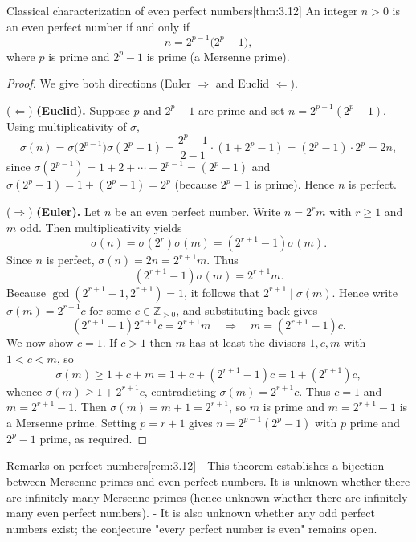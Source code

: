 \documentclass[10pt]{article}
\theoremstyle{definition}
\theoremstyle{plain}
\numberwithin{equation}{section}
\begin{document}
\begin{define}{Classical characterization of even perfect numbers}[thm:3.12]
An integer $n>0$ is an even perfect number if and only if
\[
n=2^{p-1}\big(2^p-1\big),
\]
where $p$ is prime and $2^p-1$ is prime (a Mersenne prime).
\end{define}

\begin{proof}
We give both directions (Euler $\Rightarrow$ and Euclid $\Leftarrow$).

\medskip\noindent
($\Leftarrow$) \textbf{(Euclid).} Suppose $p$ and $2^p-1$ are prime and set $n=2^{p-1}(2^p-1)$. Using multiplicativity of $\sigma$,
\[
\sigma(n)=\sigma\big(2^{p-1}\big)\sigma(2^p-1)
=\frac{2^p-1}{2-1}\cdot (1+2^p-1)
=(2^p-1)\cdot 2^p = 2n,
\]
since $\sigma(2^{p-1})=1+2+\cdots+2^{p-1}=(2^p-1)$ and $\sigma(2^p-1)=1+(2^p-1)=2^p$ (because $2^p-1$ is prime). Hence $n$ is perfect.

\medskip\noindent
($\Rightarrow$) \textbf{(Euler).} Let $n$ be an even perfect number. Write $n=2^r m$ with $r\ge1$ and $m$ odd. Then multiplicativity yields
\[
\sigma(n)=\sigma(2^r)\sigma(m)=(2^{r+1}-1)\sigma(m).
\]
Since $n$ is perfect, $\sigma(n)=2n=2^{r+1}m$. Thus
\[
(2^{r+1}-1)\sigma(m)=2^{r+1}m.
\]
Because $\gcd(2^{r+1}-1,2^{r+1})=1$, it follows that $2^{r+1}\mid \sigma(m)$. Hence write $\sigma(m)=2^{r+1}c$ for some $c\in\mathbb{Z}_{>0}$, and substituting back gives
\[
(2^{r+1}-1)2^{r+1}c=2^{r+1}m \quad\Longrightarrow\quad m=(2^{r+1}-1)c.
\]
We now show $c=1$. If $c>1$ then $m$ has at least the divisors $1,c,m$ with $1<c<m$, so
\[
\sigma(m)\ge 1+c+m = 1+c+(2^{r+1}-1)c = 1 + (2^{r+1})c,
\]
whence $\sigma(m)\ge 1 + 2^{r+1}c$, contradicting $\sigma(m)=2^{r+1}c$. Thus $c=1$ and $m=2^{r+1}-1$. Then $\sigma(m)=m+1=2^{r+1}$, so $m$ is prime and $m=2^{r+1}-1$ is a Mersenne prime. Setting $p=r+1$ gives $n=2^{p-1}(2^p-1)$ with $p$ prime and $2^p-1$ prime, as required.
\end{proof}

\begin{define}{Remarks on perfect numbers}[rem:3.12]
- This theorem establishes a bijection between Mersenne primes and even perfect numbers. It is unknown whether there are infinitely many Mersenne primes (hence unknown whether there are infinitely many even perfect numbers).  
- It is also unknown whether any odd perfect numbers exist; the conjecture "every perfect number is even" remains open.
\end{define}

\bigskip
\end{document}
